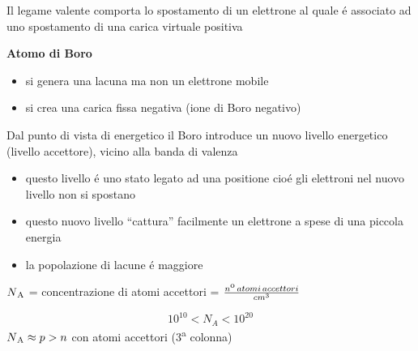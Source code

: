 Il legame valente comporta lo spostamento di un elettrone al quale \'e associato ad uno spostamento di una carica virtuale positiva

\textbf{Atomo di Boro}
\begin{itemize}
    \item si genera una lacuna ma non un elettrone mobile
    \item si crea una carica fissa negativa (ione di Boro negativo)
\end{itemize}

Dal punto di vista di energetico il Boro introduce un nuovo livello energetico (livello accettore), vicino alla banda di valenza
\begin{itemize}
    \item questo livello \'e uno stato legato ad una positione cio\'e gli elettroni nel nuovo livello non si spostano
    \item questo nuovo livello ``cattura'' facilmente un elettrone a spese di una piccola energia
    \item la popolazione di lacune \'e maggiore
\end{itemize}

$N\textsubscript{A}$ = concentrazione di atomi accettori = $\frac{n\textsuperscript{o}\,atomi\,accettori}{cm^3}$

\[
    10^{10} < N_{A} < 10^{20}
\]
$N\textsubscript{A} \approx p > n$ con atomi accettori (3\textsuperscript{a} colonna)

